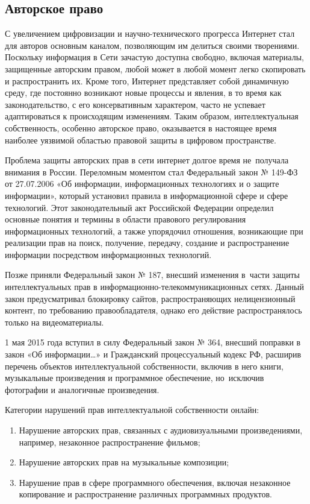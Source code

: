 \documentclass{ou}
\begin{document}
\subsection{Авторское право}
С увеличением цифровизации и научно-технического прогресса Интернет стал для авторов основным каналом, позволяющим им делиться своими творениями. Поскольку информация в Сети зачастую доступна свободно, включая материалы, защищенные авторским правом, любой может в любой момент легко скопировать и распространить их. Кроме того, Интернет представляет собой динамичную среду, где постоянно возникают новые процессы и явления, в то время как законодательство, с его консервативным характером, часто не успевает адаптироваться к происходящим изменениям. Таким образом, интеллектуальная собственность, особенно авторское право, оказывается в настоящее время наиболее уязвимой областью правовой защиты в цифровом пространстве.

Проблема защиты авторских прав в сети интернет долгое время не~получала внимания в России. Переломным моментом стал Федеральный закон № 149-ФЗ от 27.07.2006 «Об информации, информационных технологиях и о защите информации», который установил правила в информационной сфере и сфере технологий. Этот законодательный акт Российской Федерации определил основные понятия и термины в области правового регулирования информационных технологий, а также упорядочил отношения, возникающие при реализации прав на поиск, получение, передачу, создание и распространение информации посредством информационных технологий.

Позже приняли Федеральный закон № 187, внесший изменения в~части защиты интеллектуальных прав в информационно-телекоммуникационных сетях. Данный закон предусматривал блокировку сайтов, распространяющих нелицензионный контент, по требованию правообладателя, однако его действие распространялось только на видеоматериалы.

1 мая 2015 года вступил в силу Федеральный закон № 364, внесший поправки в закон «Об информации…» и Гражданский процессуальный кодекс РФ, расширив перечень объектов интеллектуальной собственности, включив в него книги, музыкальные произведения и программное обеспечение, но~исключив фотографии и аналогичные произведения.

Категории нарушений прав интеллектуальной собственности онлайн:
\begin{enumerate}[leftmargin=0em, itemindent=3.75em, nosep, label=\arabic*)]
\item Нарушение авторских прав, связанных с аудиовизуальными произведениями, например, незаконное распространение фильмов;
\item Нарушение авторских прав на музыкальные композиции;
\item Нарушение прав в сфере программного обеспечения, включая незаконное копирование и распространение различных программных продуктов.
\end{enumerate}
\end{document}
